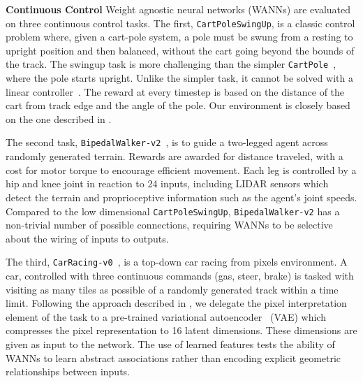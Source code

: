 
\textbf{Continuous Control}\:
Weight agnostic neural networks (WANNs) are evaluated on three continuous control tasks.
%
The first, \texttt{CartPoleSwingUp}, is a classic control problem where, given a cart-pole system, a pole must be swung from a resting to upright position and then balanced, without the cart going beyond the bounds of the track.
%
The swingup task is more challenging than the simpler \texttt{CartPole}~\cite{openai_gym}, where the pole starts upright. Unlike the simpler task, it cannot be solved with a linear controller~\cite{tedrake2009underactuated,raiko2009variational}.
%
The reward at every timestep is based on the distance of the cart from track edge and the angle of the pole.
%
Our environment is closely based on the one described in \cite{gal2016improving,deepPILCOgithub}.

The second task, \texttt{BipedalWalker-v2}~\cite{openai_gym}, is to guide a two-legged agent across randomly generated terrain. 
%
Rewards are awarded for distance traveled, with a cost for motor torque to encourage efficient movement. 
%
Each leg is controlled by a hip and knee joint in reaction to 24 inputs, including LIDAR sensors which detect the terrain and proprioceptive information such as the agent's joint speeds. 
%
Compared to the low dimensional \texttt{CartPoleSwingUp}, \texttt{BipedalWalker-v2} has a non-trivial number of possible connections, requiring WANNs to be selective about the wiring of inputs to outputs.


The third, \texttt{CarRacing-v0}~\cite{openai_gym}, is a top-down car racing from pixels environment.
%
A car, controlled with three continuous commands (gas, steer, brake) is tasked with visiting as many tiles as possible of a randomly generated track within a time limit. 
%
Following the approach described in \cite{ha2018worldmodels}, we delegate the pixel interpretation element of the task to a pre-trained variational autoencoder~\cite{kingma2013auto,vae_dm} (VAE) which compresses the pixel representation to 16 latent dimensions. These dimensions are given as input to the network. 
%
The use of learned features tests the ability of WANNs to learn abstract associations rather than encoding explicit geometric relationships between inputs.



